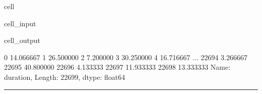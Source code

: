 \documentclass[letterpaper,10pt,english]{sphinxmanual}
\begin{document}
\begin{sphinxuseclass}{cell}
\begin{sphinxuseclass}{cell_input}
\begin{sphinxVerbatim}[commandchars=\\\{\}]
\PYG{p}{[}\PYG{p}{]}
\end{sphinxVerbatim}

\end{sphinxuseclass}
\begin{sphinxuseclass}{cell_output}
\begin{sphinxVerbatim}[commandchars=\\\{\}]
0        14.066667
1        26.500000
2         7.200000
3        30.250000
4        16.716667
           ...    
22694     3.266667
22695    40.800000
22696     4.133333
22697    11.933333
22698    13.333333
Name: duration, Length: 22699, dtype: float64
\end{sphinxVerbatim}

\end{sphinxuseclass}
\end{sphinxuseclass}

\bigskip\hrule\bigskip


\sphinxAtStartPar
{}
\end{document}
